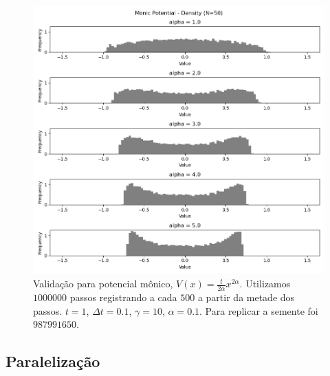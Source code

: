 \begin{center}
	\begin{figure}
		\includegraphics[scale=0.6]{images/validationArticleMonic}
		\caption{Validação para potencial mônico, $V(x) = \frac{t}{2 \alpha} x^{2\alpha}$. Utilizamos $1000000$ passos registrando a cada $500$ a partir da metade dos passos. $t = 1$, $\Delta t = 0.1$, $\gamma = 10$, $\alpha = 0.1$. Para replicar a semente foi $987991650$.}
	\end{figure}
\end{center}

\subsection{Paralelização}

